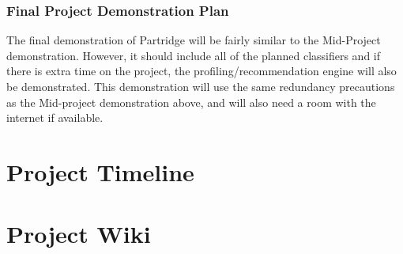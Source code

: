 \documentclass[12pt,a4paper]{article}
\begin{document}
\subsubsection{ Final Project Demonstration Plan}

The final demonstration of Partridge will be fairly similar to the Mid-Project
demonstration. However, it should include all of the planned classifiers and if
there is extra time on the project, the profiling/recommendation engine will
also be demonstrated. This demonstration will use the same redundancy
precautions as the Mid-project demonstration above, and will also need a room
with the internet if available.

\appendix
\section{Project Timeline}
\label{sec:timeline}

\appendix
\section{Project Wiki}
\label{sec:wiki}


\pagebreak


\end{document}
